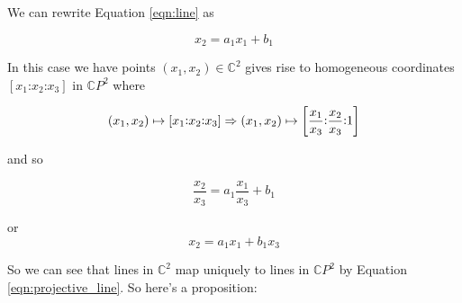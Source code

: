 \documentclass{article}
\theoremstyle{definition}
\begin{document}
\bigskip
\noindent
We can rewrite Equation \ref{eqn:line} as 

\begin{equation*}
x_2 = a_1 x_1 + b_1
\end{equation*}

\bigskip
\noindent
In this case we have points $(x_1,x_2) \in \mathbb{C}^2$ gives rise to homogeneous coordinates $[x_1 \mathord{:}   x_2 \mathord{:}   x_3]$
in $\mathbb{C}P^2$ where

\bigskip
\begin{equation*}
(x_1,x_2) \mapsto [x_1  \mathord{:}  x_2  \mathord{:}  x_3] \Rightarrow \\
(x_1,x_2) \mapsto  \bigg [ \frac{x_1}{x_3}  \mathord{:}  \frac{x_2}{x_3}  \mathord{:}  1 \bigg ]
\end{equation*}

\bigskip
\noindent
and so

\bigskip
\begin{equation*}
\frac{x_2}{x_3} = a_1 \frac{x_1}{x_3} + b_1
\end{equation*}

\bigskip
\noindent
or 
\begin{equation}
x_2 = a_1 x_1 + b_1 x_3
\label{eqn:projective_line}
\end{equation}


\bigskip
\noindent
So we can see that lines in $\mathbb{C}^2$ map uniquely to lines in $\mathbb{C}P^2$ by Equation \ref{eqn:projective_line}. So here's a proposition:
\end{document}

